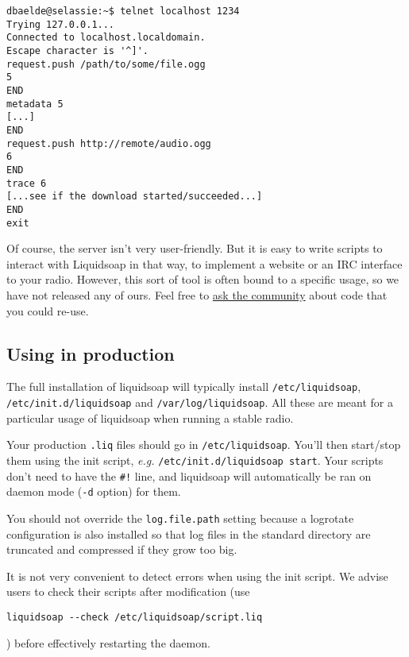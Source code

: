 \begin{verbatim}
dbaelde@selassie:~$ telnet localhost 1234
Trying 127.0.0.1...
Connected to localhost.localdomain.
Escape character is '^]'.
request.push /path/to/some/file.ogg
5
END
metadata 5
[...]
END
request.push http://remote/audio.ogg
6
END
trace 6
[...see if the download started/succeeded...]
END
exit
\end{verbatim}
Of course, the server isn't very user-friendly.
But it is easy to write scripts to interact with Liquidsoap in that way,
to implement a website or an IRC interface to your radio.
However, this sort of tool is often bound to a specific usage, so we have
not released any of ours. Feel free to
\href{mailto:savonet-users@lists.sf.net}{ask the community} about code that you could re-use.

\subsection{Using in production}
The full installation of liquidsoap will typically install
\verb+/etc/liquidsoap+, \verb+/etc/init.d/liquidsoap+ and \verb+/var/log/liquidsoap+.
All these are meant for a particular usage of liquidsoap
when running a stable radio.

Your production \verb+.liq+ files should go in \verb+/etc/liquidsoap+.
You'll then start/stop them using the init script, \emph{e.g.}
\verb+/etc/init.d/liquidsoap start+.
Your scripts don't need to have the \verb+#!+ line,
and liquidsoap will automatically be ran on daemon mode (\verb+-d+ option) for them.

You should not override the \verb+log.file.path+ setting because a
logrotate configuration is also installed so that log files
in the standard directory are truncated and compressed if they grow too big.

It is not very convenient to detect errors when using the init script.
We advise users to check their scripts after modification (use
\begin{verbatim}
liquidsoap --check /etc/liquidsoap/script.liq
\end{verbatim}
)
before effectively restarting the daemon.

